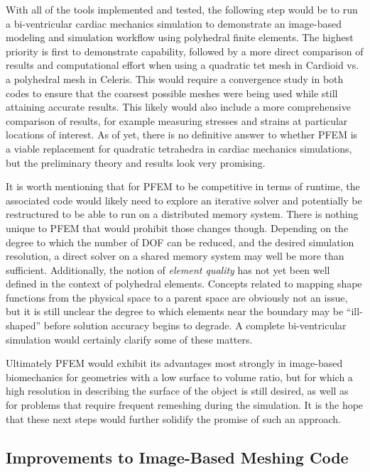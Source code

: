 With all of the tools implemented and tested, the following step would be to run a bi-ventricular cardiac mechanics simulation to demonstrate an image-based modeling and simulation workflow using polyhedral finite elements. The highest priority is first to demonstrate capability, followed by a more direct comparison of results and computational effort when using a quadratic tet mesh in Cardioid vs. a polyhedral mesh in Celeris. This would require a convergence study in both codes to ensure that the coarsest possible meshes were being used while still attaining accurate results. This likely would also include a more comprehensive comparison of results, for example measuring stresses and strains at particular locations of interest. As of yet, there is no definitive answer to whether PFEM is a viable replacement for quadratic tetrahedra in cardiac mechanics simulations, but the preliminary theory and results look very promising.

It is worth mentioning that for PFEM to be competitive in terms of runtime, the associated code would likely need to explore an iterative solver and potentially be restructured to be able to run on a distributed memory system. There is nothing unique to PFEM that would prohibit those changes though. Depending on the degree to which the number of DOF can be reduced, and the desired simulation resolution, a direct solver on a shared memory system may well be more than sufficient. Additionally, the notion of \textit{element quality} has not yet been well defined in the context of polyhedral elements. Concepts related to mapping shape functions from the physical space to a parent space are obviously not an issue, but it is still unclear the degree to which elements near the boundary may be ``ill-shaped'' before solution accuracy begins to degrade. A complete bi-ventricular simulation would certainly clarify some of these matters.

Ultimately PFEM would exhibit its advantages most strongly in image-based biomechanics for geometries with a low surface to volume ratio, but for which a high resolution in describing the surface of the object is still desired, as well as for problems that require frequent remeshing during the simulation. It is the hope that these next steps would further solidify the promise of such an approach.

\subsection{Improvements to Image-Based Meshing Code}
\label{Improvements to Image-Based Meshing Code}

